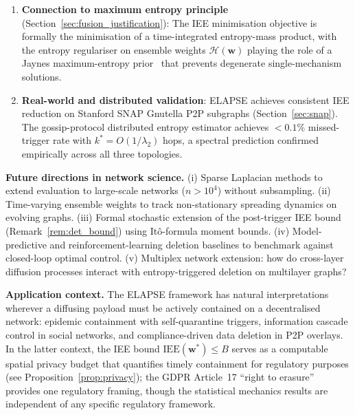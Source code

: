 \documentclass[review,12pt]{elsarticle}
\newcommand{\bfw}{\mathbf{w}}
\newcommand{\IEE}{\mathrm{IEE}}
\begin{document}
\begin{enumerate}
        (Theorem~\ref{thm:iee_bound}, Corollary~\ref{cor:lambda2}), and
        exact convexity of the linearised objective (Theorem~\ref{thm:lin_convex})
        are established rigorously.
  \item \textbf{Connection to maximum entropy principle}
        (Section~\ref{sec:fusion_justification}):
        The IEE minimisation objective is formally the minimisation of a
        time-integrated entropy-mass product, with the entropy regulariser
        on ensemble weights $\mathcal{H}(\bfw)$ playing the role of a
        Jaynes maximum-entropy prior~\cite{jaynes1957information} that
        prevents degenerate single-mechanism solutions.
  \item \textbf{Real-world and distributed validation}:
        ELAPSE achieves consistent IEE reduction on Stanford SNAP Gnutella
        P2P subgraphs (Section~\ref{sec:snap}).  The gossip-protocol
        distributed entropy estimator achieves $< 0.1\%$ missed-trigger
        rate with $k^* = O(1/\lambda_2)$ hops, a spectral prediction
        confirmed empirically across all three topologies.
\end{enumerate}

\textbf{Future directions in network science.}
(i) Sparse Laplacian methods to extend evaluation to large-scale networks
($n > 10^4$) without subsampling.
(ii) Time-varying ensemble weights to track non-stationary spreading dynamics
on evolving graphs.
(iii) Formal stochastic extension of the post-trigger IEE bound
(Remark~\ref{rem:det_bound}) using It\^o-formula moment bounds.
(iv) Model-predictive and reinforcement-learning deletion baselines to
benchmark against closed-loop optimal control.
(v) Multiplex network extension: how do cross-layer diffusion processes
interact with entropy-triggered deletion on multilayer graphs?

\textbf{Application context.}
The ELAPSE framework has natural interpretations wherever a diffusing
payload must be actively contained on a decentralised network: epidemic
containment with self-quarantine triggers, information cascade control
in social networks, and compliance-driven data deletion in P2P overlays.
In the latter context, the IEE bound $\IEE(\bfw^*) \leq B$ serves as
a computable spatial privacy budget that quantifies timely containment
for regulatory purposes (see Proposition~\ref{prop:privacy});
the GDPR Article~17 ``right to erasure''~\cite{gdpr2016} provides one
regulatory framing, though the statistical mechanics results are
independent of any specific regulatory framework.
\end{document}
